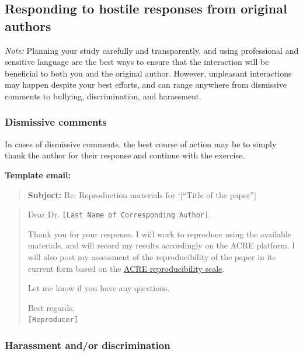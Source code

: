\documentclass[]{book}
\begin{document}
\hypertarget{responding-to-hostile-responses-from-original-authors}{%
\subsection{Responding to hostile responses from original authors}\label{responding-to-hostile-responses-from-original-authors}}

\emph{Note:} Planning your study carefully and transparently, and using professional and sensitive language are the best ways to ensure that the interaction will be beneficial to both you and the original author. However, unpleasant interactions may happen despite your best efforts, and can range anywhere from dismissive comments to bullying, discrimination, and harassment.

\hypertarget{dismissive-comments}{%
\subsubsection{Dismissive comments}\label{dismissive-comments}}

In cases of dismissive comments, the best course of action may be to simply thank the author for their response and continue with the exercise.

\textbf{Template email:}

\begin{quote}
\textbf{Subject:} Re: Reproduction materials for `{[}``Title of the paper''{]}
\end{quote}

\begin{quote}
Dear Dr. \texttt{{[}Last\ Name\ of\ Corresponding\ Author{]}},

Thank you for your response. I will work to reproduce using the available materials, and will record my results accordingly on the ACRE platform. l will also post my assessment of the reproducibility of the paper in its current form based on the \href{https://bitss.github.io/ACRE/assessment.html\#levels-of-computational-reproducibility-for-a-specific-output}{ACRE reproducibility scale}.

Let me know if you have any questions.

Best regards,\\
\texttt{{[}Reproducer{]}}
\end{quote}

\hypertarget{harassment-andor-discrimination}{%
\subsubsection{Harassment and/or discrimination}\label{harassment-andor-discrimination}}
\end{document}
